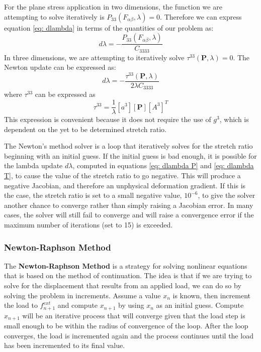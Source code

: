 \documentclass[]{spie}  %
\begin{document}
For the plane stress application in two dimensions, the function we are attempting to solve iteratively is $P_{33}(F_{\alpha\beta}, \lambda) = 0$. Therefore we can express equation \ref{eq: dlambda} in terms of the quantities of our problem as:
\begin{equation}
\label{eq: dlambda P}
d\lambda = - \frac{P_{33}(F_{\alpha\beta}, \lambda)}{C_{3333}}
\end{equation}
In three dimensions, we are attempting to iteratively solve $\tau^{33}(\bm{P}, \lambda) = 0$. The Newton update can be expressed as:
\begin{equation}
\label{eq: dlambda T}
d\lambda = - \frac{\tau^{33}(\bm{P}, \lambda)}{2 \lambda C_{3333}}
\end{equation}
where $\tau^{33}$ can be expressed as
\begin{equation}
\tau^{33} = \frac{1}{\lambda} \left[a^3\right]\left[\bm{P}\right]\left[A^3\right]^T
\end{equation}
This expression is convenient because it does not require the use of $g^3$, which is dependent on the yet to be determined stretch ratio.

The Newton's method solver is a loop that iteratively solves for the stretch ratio beginning with an initial guess. If the initial guess is bad enough, it is possible for the lambda update $d\lambda$, computed in equations \ref{eq: dlambda P} and \ref{eq: dlambda T}, to cause the value of the stretch ratio to go negative. This will produce a negative Jacobian, and therefore an unphysical deformation gradient. If this is the case, the stretch ratio is set to a small negative value, $10^{-6}$, to give the solver another chance to converge rather than simply raising a Jacobian error. In many cases, the solver will still fail to converge and will raise a convergence error if the maximum number of iterations (set to 15) is exceeded.  

\subsubsection{Newton-Raphson Method}
\label{sec: newton raphson method}
The \textbf{Newton-Raphson Method} is a strategy for solving nonlinear equations that is based on the method of continuation. The idea is that if we are trying to solve for the displacement that results from an applied load, we can do so by solving the problem in increments. Assume a value $x_n$ is known, then increment the load to $f^{ext}_{n+1}$ and compute $x_{n+1}$ by using $x_n$ as an initial guess. Compute $x_{n+1}$ will be an iterative process that will converge given that the load step is small enough to be within the radius of convergence of the loop. After the loop converges, the load is incremented again and the process continues until the load has been incremented to its final value. 
\end{document}
